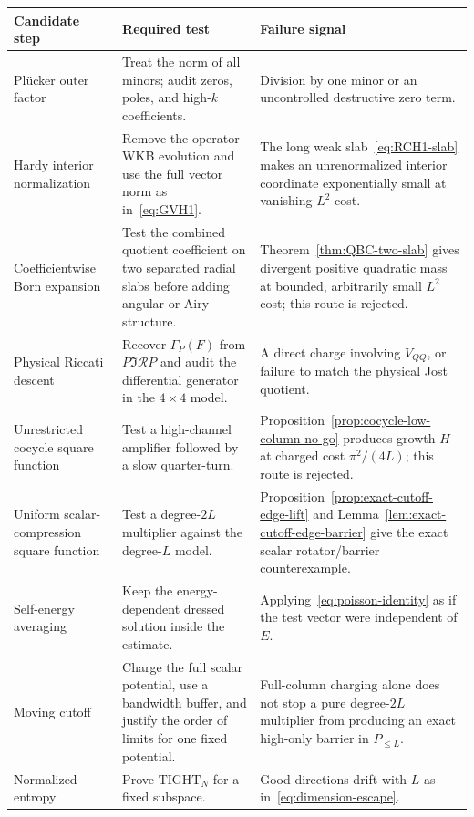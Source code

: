 \documentclass[11pt]{article}
\theoremstyle{definition}
\theoremstyle{remark}
\begin{document}
\begin{longtable}{>{\raggedright\arraybackslash}p{}>{\raggedright\arraybackslash}p{}>{\raggedright\arraybackslash}p{}}
\toprule
Candidate step & Required test & Failure signal \\
\midrule
Pl\"ucker outer factor & Treat the norm of all minors; audit zeros, poles, and high-$k$ coefficients. & Division by one minor or an uncontrolled destructive zero term. \\
Hardy interior normalization & Remove the operator WKB evolution and use the full vector norm as in~\eqref{eq:GVH1}. & The long weak slab~\eqref{eq:RCH1-slab} makes an unrenormalized interior coordinate exponentially small at vanishing $L^2$ cost. \\
Coefficientwise Born expansion & Test the combined quotient coefficient on two separated radial slabs before adding angular or Airy structure. & Theorem~\ref{thm:QBC-two-slab} gives divergent positive quadratic mass at bounded, arbitrarily small $L^2$ cost; this route is rejected. \\
Physical Riccati descent & Recover $\Gamma_P(F)$ from $P\Im\mathcal RP$ and audit the differential generator in the $4\times4$ model. & A direct charge involving $V_{QQ}$, or failure to match the physical Jost quotient. \\
Unrestricted cocycle square function & Test a high-channel amplifier followed by a slow quarter-turn. & Proposition~\ref{prop:cocycle-low-column-no-go} produces growth $H$ at charged cost $\pi^2/(4L)$; this route is rejected. \\
Uniform scalar-compression square function & Test a degree-$2L$ multiplier against the degree-$L$ model. & Proposition~\ref{prop:exact-cutoff-edge-lift} and Lemma~\ref{lem:exact-cutoff-edge-barrier} give the exact scalar rotator/barrier counterexample. \\
Self-energy averaging & Keep the energy-dependent dressed solution inside the estimate. & Applying~\eqref{eq:poisson-identity} as if the test vector were independent of $E$. \\
Moving cutoff & Charge the full scalar potential, use a bandwidth buffer, and justify the order of limits for one fixed potential. & Full-column charging alone does not stop a pure degree-$2L$ multiplier from producing an exact high-only barrier in $P_{\leq L}$. \\
Normalized entropy & Prove $\mathrm{TIGHT}_N$ for a fixed subspace. & Good directions drift with $L$ as in~\eqref{eq:dimension-escape}. \\

\end{longtable}
\end{document}
